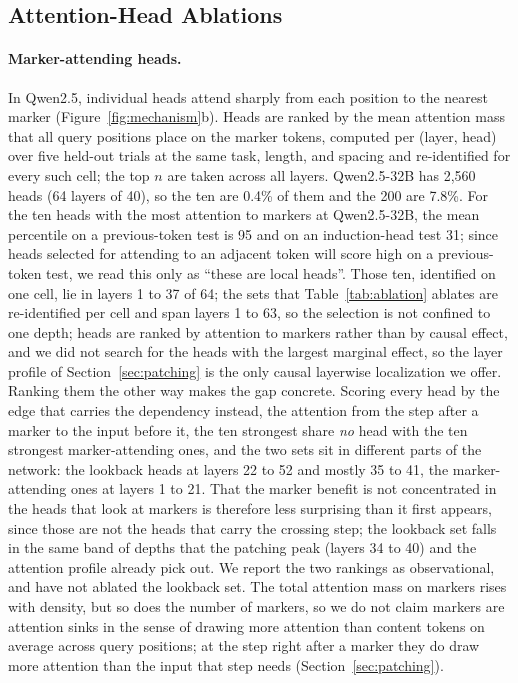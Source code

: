 \documentclass[10pt]{article} %
\begin{document}
\subsection{Attention-Head Ablations}

\paragraph{Marker-attending heads.} In Qwen2.5, individual heads attend sharply from each position to the nearest marker (Figure~\ref{fig:mechanism}b). Heads are ranked by the mean attention mass that all query positions place on the marker tokens, computed per (layer, head) over five held-out trials at the same task, length, and spacing and re-identified for every such cell; the top $n$ are taken across all layers. Qwen2.5-32B has 2,560 heads (64 layers of 40), so the ten are 0.4\% of them and the 200 are 7.8\%. For the ten heads with the most attention to markers at Qwen2.5-32B, the mean percentile on a previous-token test is 95 and on an induction-head test 31; since heads selected for attending to an adjacent token will score high on a previous-token test, we read this only as ``these are local heads''. Those ten, identified on one cell, lie in layers 1 to 37 of 64; the sets that Table~\ref{tab:ablation} ablates are re-identified per cell and span layers 1 to 63, so the selection is not confined to one depth; heads are ranked by attention to markers rather than by causal effect, and we did not search for the heads with the largest marginal effect, so the layer profile of Section~\ref{sec:patching} is the only causal layerwise localization we offer. Ranking them the other way makes the gap concrete. Scoring every head by the edge that carries the dependency instead, the attention from the step after a marker to the input before it, the ten strongest share \emph{no} head with the ten strongest marker-attending ones, and the two sets sit in different parts of the network: the lookback heads at layers 22 to 52 and mostly 35 to 41, the marker-attending ones at layers 1 to 21. That the marker benefit is not concentrated in the heads that look at markers is therefore less surprising than it first appears, since those are not the heads that carry the crossing step; the lookback set falls in the same band of depths that the patching peak (layers 34 to 40) and the attention profile already pick out. We report the two rankings as observational, and have not ablated the lookback set. The total attention mass on markers rises with density, but so does the number of markers, so we do not claim markers are attention sinks in the sense of drawing more attention than content tokens on average across query positions; at the step right after a marker they do draw more attention than the input that step needs (Section~\ref{sec:patching}).
\end{document}
